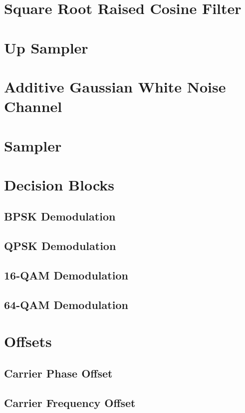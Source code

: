 \documentclass[]{article}
\begin{document}
\newpage
\section{Square Root Raised Cosine Filter}
\label{app:sqrt_raised_cosine}



\section{Up Sampler}
\label{app:impulse_train}


\section{Additive Gaussian White Noise Channel}
\label{app:awgn_channel}


\newpage
\section{Sampler}
\label{app:sampler}



\section{Decision Blocks}
\label{app:dblocks}
\subsection{BPSK Demodulation}
\label{app:bpsk_demod}


\newpage
\subsection{QPSK Demodulation}
\label{app:qpsk_demod}


\subsection{16-QAM Demodulation}
\label{app:qam_16_demod}


\newpage
\subsection{64-QAM Demodulation}
\label{app:qam_64_demod}


\newpage
\section{Offsets}
\label{app:offsets}
\subsection{Carrier Phase Offset}
\label{app:phase_offset}


\newpage
\subsection{Carrier Frequency Offset}
\label{app:freq_offset}

\end{document}
